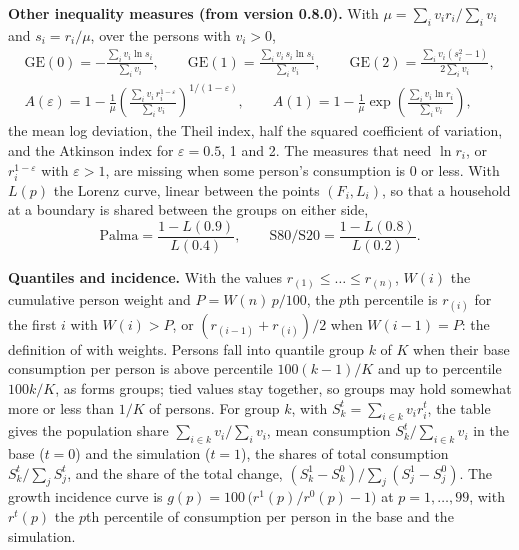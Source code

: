 \textbf{Other inequality measures (from version 0.8.0).} With
$\mu = \sum_i v_i r_i / \sum_i v_i$ and $s_i = r_i / \mu$, over the persons with
$v_i > 0$,
\begin{gather*}
\text{GE}(0) = -\frac{\sum_i v_i \ln s_i}{\sum_i v_i}, \qquad
\text{GE}(1) = \frac{\sum_i v_i\, s_i \ln s_i}{\sum_i v_i}, \qquad
\text{GE}(2) = \frac{\sum_i v_i (s_i^2 - 1)}{2 \sum_i v_i},\\
A(\varepsilon) = 1 - \frac{1}{\mu}\left(\frac{\sum_i v_i\, r_i^{1-\varepsilon}}{\sum_i v_i}\right)^{1/(1-\varepsilon)},
\qquad A(1) = 1 - \frac{1}{\mu}\exp\left(\frac{\sum_i v_i \ln r_i}{\sum_i v_i}\right),
\end{gather*}
the mean log deviation, the Theil index, half the squared coefficient of
variation, and the Atkinson index for $\varepsilon = 0.5$, 1 and 2. The
measures that need $\ln r_i$, or $r_i^{1-\varepsilon}$ with $\varepsilon > 1$,
are missing when some person's consumption is 0 or less. With $L(p)$ the
Lorenz curve, linear between the points $(F_i, L_i)$, so that a household at a
boundary is shared between the groups on either side,
\begin{equation*}
\text{Palma} = \frac{1 - L(0.9)}{L(0.4)}, \qquad \text{S80/S20} = \frac{1 - L(0.8)}{L(0.2)} .
\end{equation*}

\textbf{Quantiles and incidence.} With the values $r_{(1)} \le \dots \le r_{(n)}$,
$W(i)$ the cumulative person weight and $P = W(n)\,p/100$, the $p$th
percentile is $r_{(i)}$ for the first $i$ with $W(i) > P$, or
$(r_{(i-1)} + r_{(i)})/2$ when $W(i-1) = P$: the definition of 
with weights. Persons fall into quantile group $k$ of $K$ when their base
consumption per person is above percentile $100(k-1)/K$ and up to percentile
$100k/K$, as  forms groups; tied values stay together, so groups
may hold somewhat more or less than $1/K$ of persons. For group $k$, with
$S^t_k = \sum_{i \in k} v_i r^t_i$, the table gives the population share
$\sum_{i \in k} v_i / \sum_i v_i$, mean consumption $S^t_k / \sum_{i \in k} v_i$
in the base ($t = 0$) and the simulation ($t = 1$), the shares of total
consumption $S^t_k / \sum_j S^t_j$, and the share of the total change,
$(S^1_k - S^0_k) / \sum_j (S^1_j - S^0_j)$. The growth incidence curve
\citep{ravallion2003} is $g(p) = 100\,\bigl(r^1(p)/r^0(p) - 1\bigr)$ at
$p = 1, \dots, 99$, with $r^t(p)$ the $p$th percentile of consumption per person
in the base and the simulation.

